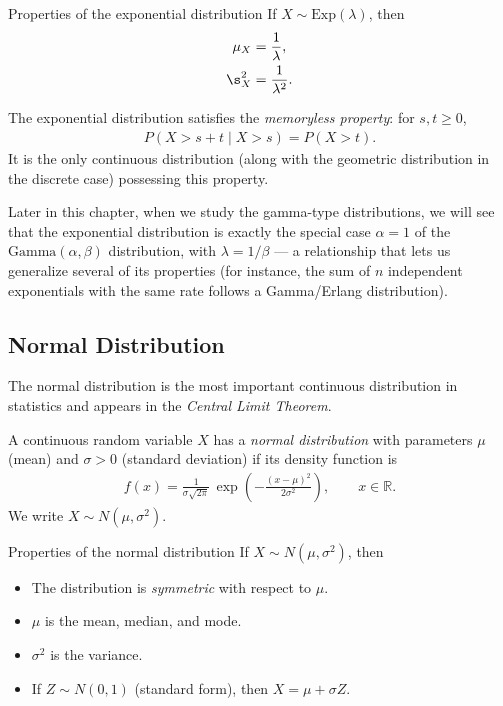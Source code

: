 {Properties of the exponential distribution} If $X \sim \text{Exp}(\lambda)$, then
\begin{align}
 \mu_X &= \frac{1}{\lambda}, \\
 \s_X^2 &= \frac{1}{\lambda^2}.
\end{align}

\begin{observacion}
The exponential distribution satisfies the \emph{memoryless property}: for $s, t \geq 0$,
\begin{align}
 P(X > s + t \mid X > s) = P(X > t).
\end{align}
It is the only continuous distribution (along with the geometric distribution in the discrete case) possessing this property.
\end{observacion}

\begin{observacion}
Later in this chapter, when we study the gamma-type distributions, we will see that the
exponential distribution is exactly the special case $\alpha=1$ of the
$\text{Gamma}(\alpha,\beta)$ distribution, with $\lambda = 1/\beta$ — a relationship
that lets us generalize several of its properties (for instance, the sum of $n$
independent exponentials with the same rate follows a Gamma/Erlang distribution).
\end{observacion}

\subsection{Normal Distribution}

The normal distribution is the most important continuous distribution in statistics and appears in the \emph{Central Limit Theorem}.

\begin{definicion}
A continuous random variable $X$ has a \emph{normal distribution} with parameters $\mu$ (mean) and $\sigma > 0$ (standard deviation) if its density function is
\begin{align}
 \label{eq:2.8.3}
 f(x) = \frac{1}{\sigma\sqrt{2\pi}}\,\exp\!\left(-\frac{(x-\mu)^2}{2\sigma^2}\right),
 \qquad x \in \mathbb{R}.
\end{align}
We write $X \sim N(\mu, \sigma^2)$.
\end{definicion}

{Properties of the normal distribution} If $X \sim N(\mu,\sigma^2)$, then
\begin{itemize}
 \item The distribution is \emph{symmetric} with respect to $\mu$.
 \item $\mu$ is the mean, median, and mode.
 \item $\sigma^2$ is the variance.
 \item If $Z \sim N(0,1)$ (standard form), then $X = \mu + \sigma Z$.
\end{itemize}

